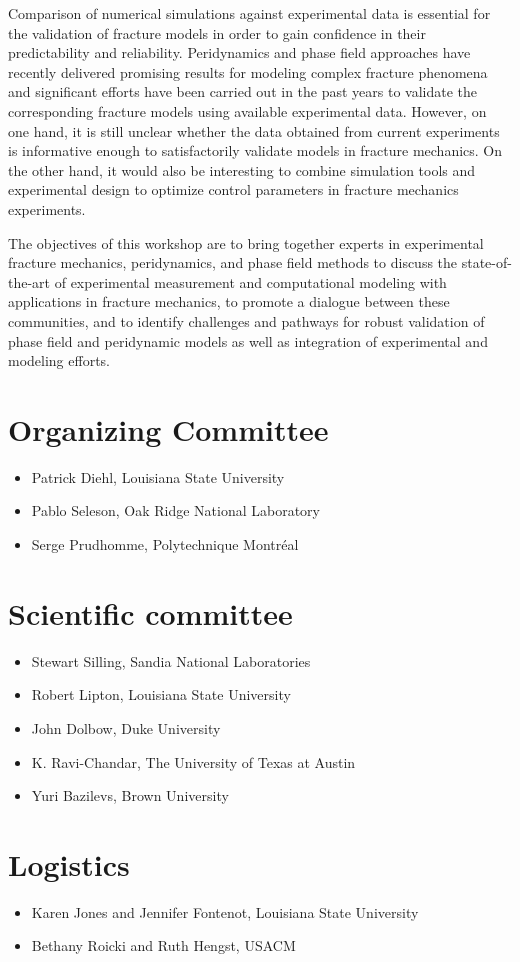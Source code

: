 Comparison of numerical simulations against experimental data is essential
for the validation of fracture models in order to gain confidence in their
predictability and reliability. Peridynamics and phase field approaches have recently
delivered promising results for modeling complex fracture phenomena and significant
efforts have been carried out in the past years to validate the corresponding
fracture models using available experimental data. However, on one hand, it is still
unclear whether the data obtained from current experiments is informative enough to
satisfactorily validate models in fracture mechanics. On the other hand, it would also be
interesting to combine simulation tools and experimental design to optimize
control parameters in fracture mechanics experiments.

The objectives of this workshop are to bring together experts in experimental fracture mechanics,
peridynamics, and phase field methods to discuss the state-of-the-art of experimental
measurement and computational modeling with applications in fracture mechanics, to promote
a dialogue between these communities, and to identify challenges and pathways for robust validation
of phase field and peridynamic models as well as integration of experimental and modeling efforts.

\section*{Organizing Committee}
\begin{itemize}
\item Patrick Diehl, Louisiana State University
\item Pablo Seleson, Oak Ridge National Laboratory
\item Serge Prudhomme, Polytechnique Montréal
\end{itemize}

\section*{Scientific committee}
\begin{itemize}
\item Stewart Silling, Sandia National Laboratories
\item Robert Lipton, Louisiana State University
\item John Dolbow, Duke University
\item K. Ravi-Chandar, The University of Texas at Austin
\item Yuri Bazilevs, Brown University 
\end{itemize}

\section*{Logistics}
\begin{itemize}
\item Karen Jones and Jennifer Fontenot, Louisiana State University
\item Bethany Roicki and Ruth Hengst, USACM
\end{itemize}
